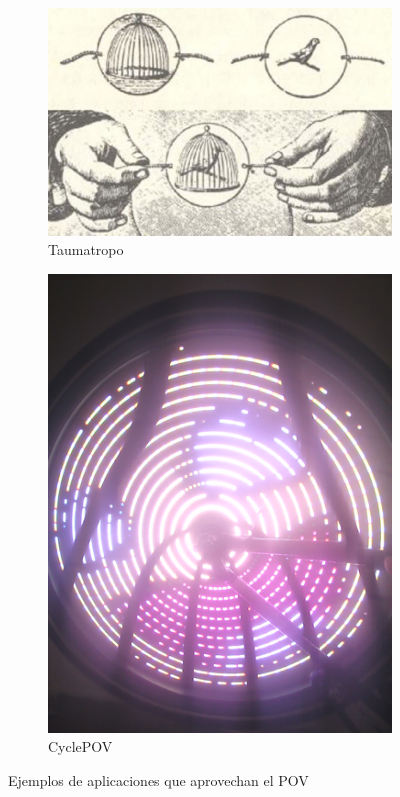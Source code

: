 \begin{figure}[!ht]
	\centering
	\begin{subfigure}[t]{0.4\textwidth}
		\centering
		\includegraphics[width=\textwidth]{img/taumatropo}
		\caption{Taumatropo}
		\label{fig:taumatropo}
	\end{subfigure}
	\hspace{0.5cm}
	\begin{subfigure}[t]{0.4\textwidth}
		\centering
		\includegraphics[width=\textwidth]{img/awesome}
		\caption{CyclePOV}
		\label{fig:awesome}
	\end{subfigure}
	\caption{Ejemplos de aplicaciones que aprovechan el POV}
\end{figure}

